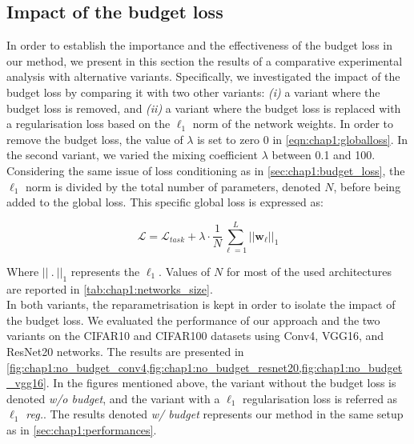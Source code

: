 
\subsection{Impact of the budget loss}
\label{sec:chap1:impact_of_budget_loss}


In order to establish the importance and the effectiveness of the budget loss in our
method, we present in this section the results of a comparative experimental
analysis with alternative variants.  Specifically, we investigated the impact of
the budget loss by comparing it with two other variants: \emph{(i)} a variant
where the budget loss is removed, and \emph{(ii)} a variant where the budget
loss is replaced with a regularisation loss based on the $\ell_1$ norm of the
network weights. In order to remove the budget loss, the value of $\lambda$ is set to
zero 0 in \cref{eqn:chap1:globalloss}. In the second variant, we varied the
mixing coefficient $\lambda$ between 0.1 and 100. Considering the same issue of
loss conditioning as in \cref{sec:chap1:budget_loss}, the $\ell_1$ norm is divided
by the total number of parameters, denoted $N$, before being added to the global loss. This
specific global loss is expressed as:

\begin{equation}
  \label{eqn:chap1:globalloss_l1}
  \mathcal{L} = \mathcal{L}_{task} + \lambda \cdot \frac{1}{N} \sum_{\ell=1}^{L} || \mathbf{w}_\ell ||_1
\end{equation}

Where $||~.~||_1$ represents the $\ell_1$. Values of $N$ for most of the used
architectures are reported in \cref{tab:chap1:networks_size}.\\

In both variants, the reparametrisation is kept in order to isolate the impact
of the budget loss. We evaluated the performance of our approach and the two
variants on the CIFAR10 and CIFAR100 datasets using Conv4, VGG16, and ResNet20
networks. The results are presented in
\cref{fig:chap1:no_budget_conv4,fig:chap1:no_budget_resnet20,fig:chap1:no_budget_vgg16}.
In the figures mentioned above, the variant without the budget loss is denoted
\emph{w/o budget}, and the variant with a $\ell_1$ regularisation loss is referred
as \emph{$\ell_1$ reg.}. The results denoted \emph{w/ budget} represents our method
in the same setup as in \cref{sec:chap1:performances}.\\

